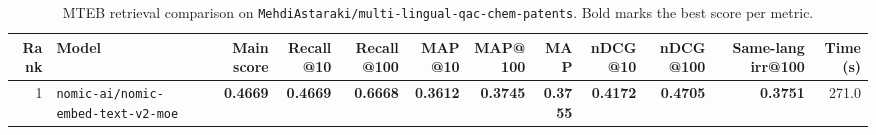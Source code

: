 \begin{table}[t]
\centering
\small
\begin{tabular}{r l r r r r r r r r r r}
\hline
Rank & Model & Main score & Recall@10 & Recall@100 & MAP@10 & MAP@100 & MAP & nDCG@10 & nDCG@100 & Same-lang irr@100 & Time (s) \\
\hline
1 & \texttt{nomic-ai/nomic-embed-text-v2-moe} & \textbf{0.4669} & \textbf{0.4669} & \textbf{0.6668} & \textbf{0.3612} & \textbf{0.3745} & \textbf{0.3755} & \textbf{0.4172} & \textbf{0.4705} & \textbf{0.3751} & 271.0 \\
\hline
\end{tabular}
\caption{MTEB retrieval comparison on \texttt{MehdiAstaraki/multi-lingual-qac-chem-patents}. Bold marks the best score per metric.}
\label{tab:mteb-model-comparison}
\end{table}
